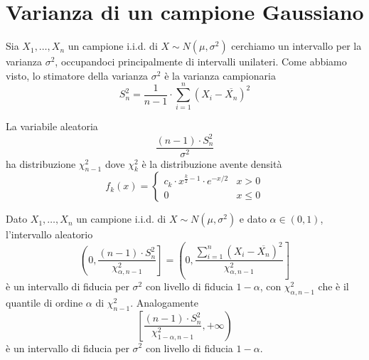 \section{Varianza di un campione Gaussiano}
Sia $X_1, \dots, X_n$ un campione i.i.d. di $X \sim N(\mu, \sigma^2)$ cerchiamo un intervallo per
la varianza $\sigma^2$, occupandoci principalmente di intervalli unilateri. Come abbiamo visto,
lo stimatore della varianza $\sigma^2$ è la varianza campionaria
\[ S_n^2 = \frac{1}{n-1} \cdot \sum_{i=1}^n (X_i - \overline{X_n})^2 \]

\begin{proposition}
	La variabile aleatoria
	\[ \frac{(n-1) \cdot S_n^2}{\sigma^2} \]
	ha distribuzione $\chi_{n-1}^2$ dove $\chi_k^2$ è la distribuzione avente densità
	\[
		f_k(x) = \begin{cases}
			c_k \cdot x^{\frac{k}{2} - 1} \cdot e^{-x/2} & x > 0    \\
			0                                            & x \leq 0
		\end{cases}
	\]
\end{proposition}

\begin{proposition}
	Dato $X_1, \dots, X_n$ un campione i.i.d. di $X \sim N(\mu, \sigma^2)$ e dato $\alpha \in (0,1)$,
	l'intervallo aleatorio
	\[
		\left( 0, \frac{(n-1) \cdot S_n^2}{\chi_{\alpha, n-1}^2} \right] =
		\left( 0, \frac{\sum_{i=1}^n (X_i - \overline{X_n})^2}{\chi_{\alpha, n-1}^2} \right]
		\]
		è un intervallo di fiducia per $\sigma^2$ con livello di fiducia $1-\alpha$, con
		$\chi_{\alpha, n-1}^2$ che è il quantile di ordine $\alpha$ di $\chi_{n-1}^2$. Analogamente
		\[ \left[ \frac{(n-1) \cdot S_n^2}{\chi_{1-\alpha, n-1}^2}, +\infty \right) \]
	è un intervallo di fiducia per $\sigma^2$ con livello di fiducia $1-\alpha$.
\end{proposition}